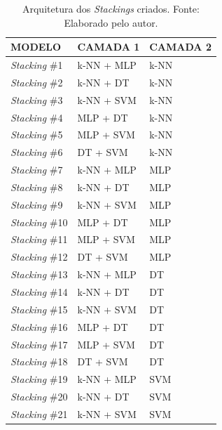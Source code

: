 \begin{longtable}{l|l|l}
\caption{Arquitetura dos \textit{Stackings} criados. Fonte: Elaborado pelo autor.}

\label{tab:modelos-stack}

\hline

\textbf{MODELO}   & \textbf{CAMADA 1 }             & \textbf{CAMADA 2} \\ \hline \hline


\textit{Stacking} \#1  & k-NN +   MLP            & k-NN \\ \hline
\textit{Stacking} \#2  & k-NN   + DT             & k-NN \\ \hline
\textit{Stacking} \#3  & k-NN + SVM              & k-NN \\ \hline
\textit{Stacking} \#4  & MLP   + DT              & k-NN \\ \hline
\textit{Stacking} \#5  & MLP + SVM               & k-NN \\ \hline
\textit{Stacking} \#6  & DT   + SVM              & k-NN \\ \hline
\textit{Stacking} \#7  & k-NN + MLP              & MLP  \\ \hline
\textit{Stacking} \#8  & k-NN   + DT             & MLP  \\ \hline
\textit{Stacking} \#9  & k-NN + SVM              & MLP  \\ \hline
\textit{Stacking} \#10 & MLP   + DT              & MLP  \\ \hline
\textit{Stacking} \#11 & MLP + SVM               & MLP  \\ \hline
\textit{Stacking} \#12 & DT   + SVM              & MLP  \\ \hline
\textit{Stacking} \#13 & k-NN + MLP              & DT   \\ \hline
\textit{Stacking} \#14 & k-NN   + DT             & DT   \\ \hline
\textit{Stacking} \#15 & k-NN + SVM              & DT   \\ \hline
\textit{Stacking} \#16 & MLP   + DT              & DT   \\ \hline
\textit{Stacking} \#17 & MLP + SVM               & DT   \\ \hline
\textit{Stacking} \#18 & DT   + SVM              & DT   \\ \hline
\textit{Stacking} \#19 & k-NN + MLP              & SVM  \\ \hline
\textit{Stacking} \#20 & k-NN   + DT             & SVM  \\ \hline
\textit{Stacking} \#21 & k-NN + SVM              & SVM  \\ \hline

\end{longtable}
